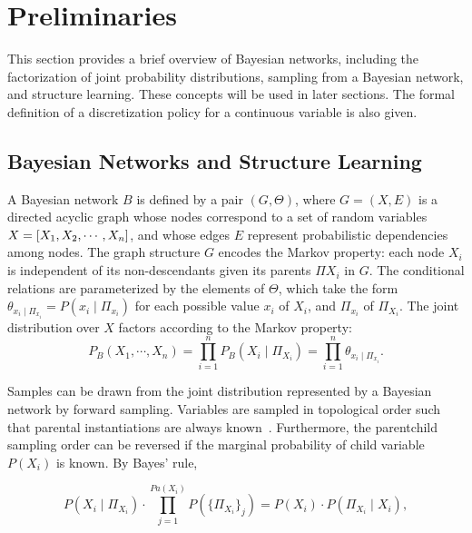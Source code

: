 
\section{Preliminaries}
\label{sec:preliminaries}
This section provides a brief overview of Bayesian networks, including the factorization of joint probability distributions, sampling from a Bayesian network, and structure learning. These concepts will be used in later sections. The formal definition of a discretization policy for a continuous variable is also given.

\subsection{Bayesian Networks and Structure Learning}

A Bayesian network $B$ is defined by a pair $(G,\Theta)$, where $G = (X,E)$ is a directed acyclic graph whose nodes correspond to a set of random variables $X = \brock{X_1, X_2, \cdots, X_n}$, and whose edges $E$ represent probabilistic dependencies among nodes. The graph structure $G$ encodes the Markov property: each node $X_i$ is independent of its non-descendants given its parents $\Pi{X_i}$ in $G$. The conditional relations are parameterized by the elements of $\Theta$, which take the form $\theta_{x_i \mid \Pi_{x_i}} = P(x_i \mid \Pi_{x_i})$ for each possible value $x_i$ of $X_i$, and $\Pi_{x_i}$ of $\Pi_{X_i}$. The joint distribution over $X$ factors according to the Markov property:
\begin{equation}
P_B (X_1 , \cdots, X_n) = \prod_{i=1}^{n} P_B (X_i \mid \Pi_{X_i}) = \prod_{i=1}^{n} \theta_{x_i \mid \Pi_{x_i}}\text{.}
\end{equation}

Samples can be drawn from the joint distribution represented by a Bayesian network by forward sampling.
Variables are sampled in topological order such that parental instantiations are always known~\citep[see][chap.~22]{algo_2009}.
Furthermore, the parent\rightarrow child sampling order can be reversed if the marginal probability of child variable $P(X_i)$ is known.
By Bayes' rule,

\begin{equation}
P(X_i \mid \Pi_{X_i}) \cdot \prod_{j = 1}^{ Pa( X_i)} P( \{ \Pi_{X_i} \}_j) = P(X_i) \cdot P(\Pi_{X_i} \mid X_i),
\end{equation}

